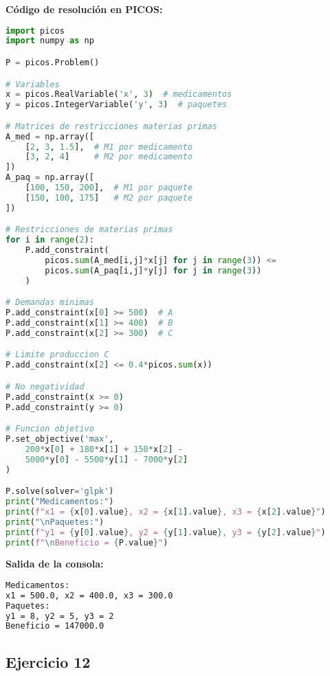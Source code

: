 \documentclass[12pt]{article}
\begin{document}
\begin{enumerate}
\textbf{Código de resolución en PICOS:}
\begin{lstlisting}[language=Python]
import picos
import numpy as np

P = picos.Problem()

# Variables
x = picos.RealVariable('x', 3)  # medicamentos
y = picos.IntegerVariable('y', 3)  # paquetes

# Matrices de restricciones materias primas
A_med = np.array([
    [2, 3, 1.5],  # M1 por medicamento
    [3, 2, 4]     # M2 por medicamento
])
A_paq = np.array([
    [100, 150, 200],  # M1 por paquete
    [150, 100, 175]   # M2 por paquete
])

# Restricciones de materias primas
for i in range(2):
    P.add_constraint(
        picos.sum(A_med[i,j]*x[j] for j in range(3)) <= 
        picos.sum(A_paq[i,j]*y[j] for j in range(3))
    )

# Demandas minimas
P.add_constraint(x[0] >= 500)  # A
P.add_constraint(x[1] >= 400)  # B
P.add_constraint(x[2] >= 300)  # C

# Limite produccion C
P.add_constraint(x[2] <= 0.4*picos.sum(x))

# No negatividad
P.add_constraint(x >= 0)
P.add_constraint(y >= 0)

# Funcion objetivo
P.set_objective('max', 
    200*x[0] + 180*x[1] + 150*x[2] - 
    5000*y[0] - 5500*y[1] - 7000*y[2]
)

P.solve(solver='glpk')
print("Medicamentos:")
print(f"x1 = {x[0].value}, x2 = {x[1].value}, x3 = {x[2].value}")
print("\nPaquetes:")
print(f"y1 = {y[0].value}, y2 = {y[1].value}, y3 = {y[2].value}")
print(f"\nBeneficio = {P.value}")
\end{lstlisting}

\textbf{Salida de la consola:}
\begin{lstlisting}[language=bash,backgroundcolor=\color{black},basicstyle=\color{white}\ttfamily,numbers=none]
Medicamentos:
x1 = 500.0, x2 = 400.0, x3 = 300.0
Paquetes:
y1 = 8, y2 = 5, y3 = 2
Beneficio = 147000.0
\end{lstlisting}

\newpage

\subsection*{Ejercicio 12}


\end{enumerate}
\end{document}
